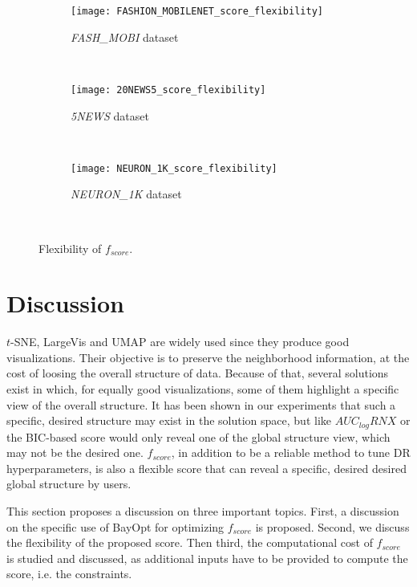 \begin{figure*}[ht!]
    \centering
    \begin{subfigure}[b]{.32\linewidth}
        \texttt{[image: FASHION\_MOBILENET\_score\_flexibility]}
        \caption{\emph{FASH\_MOBI} dataset}
        \label{fig:flexibility:FASHMOBI}
    \end{subfigure}
    ~
    \begin{subfigure}[b]{.32\linewidth}
        \texttt{[image: 20NEWS5\_score\_flexibility]}
        \caption{\emph{5NEWS} dataset}
        \label{fig:flexibility:5NEWS}
    \end{subfigure}
    ~
    \begin{subfigure}[b]{.32\linewidth}
        \texttt{[image: NEURON\_1K\_score\_flexibility]}
        \caption{\emph{NEURON\_1K} dataset}
        \label{fig:flexibility:NEURON1K}
    \end{subfigure}
    ~
    \caption{Flexibility of $f_{score}$.}
    \label{fig:flexibility}
\end{figure*}


\section{Discussion}\label{sec:discussion}

$t$-SNE, LargeVis and UMAP are widely used since they produce good visualizations.
Their objective is to preserve the neighborhood information, at the cost of loosing the overall structure of data.
Because of that, several solutions exist in which, for equally good visualizations, some of them highlight a specific view of the overall structure.
It has been shown in our experiments that such a specific, desired structure may exist in the solution space, but like $AUC_{log}RNX$ or the BIC-based score would only reveal one of the global structure view, which may not be the desired one.
$f_{score}$, in addition to be a reliable method to tune DR hyperparameters, is also a flexible score that can reveal a specific, desired desired global structure by users.

This section proposes a discussion on three important topics. First, a discussion on the specific use of BayOpt for optimizing $f_{score}$ is proposed. Second, we discuss the flexibility of the proposed score. Then third, the computational cost of $f_{score}$ is studied and discussed, as additional inputs have to be provided to compute the score, i.e. the constraints.

